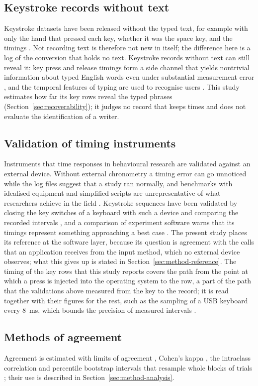 \subsection{Keystroke records without text}
\label{sec:related-content}

Keystroke datasets have been released without the typed text, for example with only the hand that pressed each key,
whether it was the space key, and the timings \citep{tappy}. Not recording text is therefore not new in itself; the difference here is a log of the
conversion that holds no text. Keystroke records without text can still reveal it: key press and release timings form a
side channel that yields nontrivial information about typed English words even under substantial measurement error
\citep{monaco2018}, and the temporal features of typing are used to recognise users \citep{whiskerd2020}. This study
estimates how far its key rows reveal the typed phrases (Section~\ref{sec:recoverability}); it judges no record that
keeps times and does not evaluate the identification of a writer.

\subsection{Validation of timing instruments}
\label{sec:related-timing}

Instruments that time responses in behavioural research are validated against an external device. Without external
chronometry a timing error can go unnoticed while the log files suggest that a study ran normally, and benchmarks with
idealised equipment and simplified scripts are unrepresentative of what researchers achieve in the field
\citep{plant2016}. Keystroke sequences have been validated by closing the key switches of a keyboard with such a device
and comparing the recorded intervals \citep{pinet2017}, and a comparison of experiment software warns that its timings
represent something approaching a best case \citep{bridges2020}. The present study places its reference at the
software layer, because its question is agreement with the calls that an application receives from the input method,
which no external device observes; what this gives up is stated in Section~\ref{sec:method-reference}. The timing of
the key rows that this study reports covers the path from the point at which a press is injected into the operating
system to the row, a part of the path that the validations above measured from the key to the record; it is read
together with their figures for the rest, such as the sampling of a USB keyboard every 8~ms, which bounds the precision
of measured intervals \citep{pinet2017}.

\subsection{Methods of agreement}
\label{sec:related-agreement}

Agreement is estimated with limits of agreement \citep{blandaltman1986}, Cohen's kappa \citep{cohen1960}, the
intraclass correlation \citep{shroutfleiss1979,mcgrawwong1996} and percentile bootstrap intervals that resample
whole blocks of trials \citep{efron1979,cameron2008}; their use is described in Section~\ref{sec:method-analysis}.
